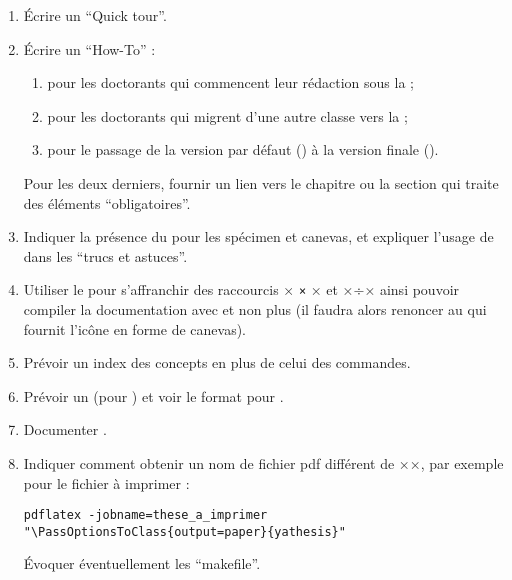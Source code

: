 \begin{enumerate}
\item Écrire un \foreignquote{english}{Quick tour}.
\item Écrire un \foreignquote{english}{How-To} :
  \begin{enumerate}
  \item pour les doctorants qui commencent leur rédaction sous la \yatcl{} ;
  \item pour les doctorants qui migrent d'une autre classe vers la \yatcl{} ;
  \item pour le passage de la version par défaut () à la
    version finale ().
  \end{enumerate}
  Pour les deux derniers, fournir un lien vers le chapitre ou la section qui
  traite des éléments \enquote{obligatoires}.
\item Indiquer la présence du  pour les spécimen et canevas, et
  expliquer l'usage de  dans les \enquote{trucs et astuces}.
\item Utiliser le  pour s'affranchir des raccourcis
  \lstDeleteShortInline×%
  \lstinline|×|
  \lstMakeShortInline[style=dbtex]×%
  et ×÷× ainsi pouvoir compiler la documentation avec  et non
  plus  (il faudra alors renoncer au 
  qui fournit l'icône en forme de canevas).
\item Prévoir un index des concepts en plus de celui des commandes.
\item Prévoir un  (pour ) et voir le format
  pour .
\item Documenter .
\item Indiquer comment obtenir un nom de fichier \gls{pdf} différent de ×\jobname×,
  par exemple pour le fichier à imprimer :
\begin{lstlisting}
pdflatex -jobname=these_a_imprimer "\PassOptionsToClass{output=paper}{yathesis}"
\end{lstlisting}
Évoquer éventuellement les \enquote{makefile}.
\end{enumerate}

%
\iffalse
\fi
